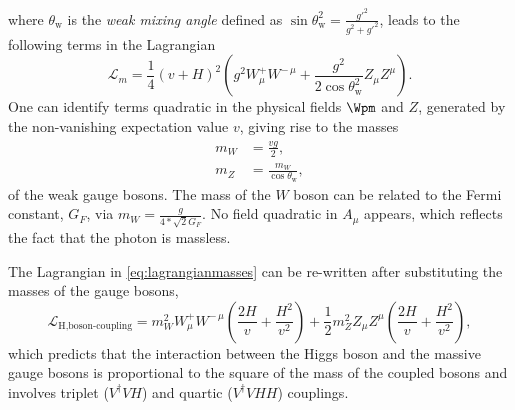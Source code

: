 where $\theta_\text{w}$ is the \emph{weak mixing angle} defined as $\sin\theta_\text{w}^2 = \frac{g'^2}{g^2+g'^2}$, leads to the following terms in the Lagrangian
\begin{equation}
  \mathcal{L}_m = \frac{1}{4} \left( v + H \right)^2  \left(g^2 W_\mu^+W^{-\,\mu} + \frac{g^2}{2\cos\theta_\text{w}^2} Z_\mu Z^\mu \right).
  \label{eq:lagrangianmasses}
\end{equation}
One can identify terms quadratic in the physical fields $\Wpm$ and $Z$, generated by the non-vanishing expectation value $v$, giving rise to the masses
\begin{align}
  m_W &= \frac{vg}{2}, \\
  m_Z &= \frac{m_W}{\cos \theta_\text{w}},
  \label{eq:boson-masses}
\end{align}
of the weak gauge bosons.
The mass of the $W$ boson can be related to the Fermi constant, $G_F$, via $m_W = \frac{g}{4 * \sqrt{2}G_F}$. 
No field quadratic in $A_\mu$ appears, which reflects the fact that the photon is massless.

The Lagrangian in \cref{eq:lagrangianmasses} can be re-written after substituting the masses of the gauge bosons,
\begin{equation}
  \mathcal{L}_{\text{H,boson-coupling}} = m_W^2 W_\mu^+W^{-\,\mu} \left( \frac{2H}{v} + \frac{H^2}{v^2} \right) + \frac{1}{2} m_Z^2 Z_\mu Z^\mu \left( \frac{2H}{v} + \frac{H^2}{v^2} \right),
  \label{eq:higgsbosoncoupling}
\end{equation}
which predicts that the interaction between the Higgs boson and the massive gauge bosons is proportional to the square of the mass of the coupled bosons and involves triplet ($V^\dagger VH$) and quartic ($V^\dagger VHH$) couplings.

